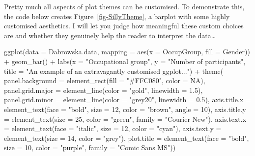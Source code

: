 \documentclass[
  letterpaper,
  DIV=11,
  numbers=noendperiod]{scrreprt}
\newenvironment{Shaded}{\begin{snugshade}}{\end{snugshade}}
\newcommand{\AttributeTok}[1]{\textcolor[rgb]{0.40,0.45,0.13}{#1}}
\newcommand{\ConstantTok}[1]{\textcolor[rgb]{0.56,0.35,0.01}{#1}}
\newcommand{\DecValTok}[1]{\textcolor[rgb]{0.68,0.00,0.00}{#1}}
\newcommand{\FloatTok}[1]{\textcolor[rgb]{0.68,0.00,0.00}{#1}}
\newcommand{\FunctionTok}[1]{\textcolor[rgb]{0.28,0.35,0.67}{#1}}
\newcommand{\NormalTok}[1]{\textcolor[rgb]{0.00,0.23,0.31}{#1}}
\newcommand{\SpecialCharTok}[1]{\textcolor[rgb]{0.37,0.37,0.37}{#1}}
\newcommand{\StringTok}[1]{\textcolor[rgb]{0.13,0.47,0.30}{#1}}
\begin{document}
Pretty much all aspects of plot themes can be customised. To demonstrate
this, the code below creates Figure~\ref{fig-SillyTheme}, a barplot with
some highly customised aesthetics. I will let you judge how meaningful
these custom choices are and whether they genuinely help the reader to
interpret the data\ldots~

\begin{Shaded}
\begin{Highlighting}[]
\FunctionTok{ggplot}\NormalTok{(}\AttributeTok{data =}\NormalTok{ Dabrowska.data,}
       \AttributeTok{mapping =} \FunctionTok{aes}\NormalTok{(}\AttributeTok{x =}\NormalTok{ OccupGroup, }\AttributeTok{fill =}\NormalTok{ Gender)) }\SpecialCharTok{+}
  \FunctionTok{geom\_bar}\NormalTok{() }\SpecialCharTok{+}
  \FunctionTok{labs}\NormalTok{(}\AttributeTok{x =} \StringTok{"Occupational group"}\NormalTok{,}
       \AttributeTok{y =} \StringTok{"Number of participants"}\NormalTok{,}
       \AttributeTok{title =} \StringTok{"An example of an extravagantly customised ggplot..."}\NormalTok{) }\SpecialCharTok{+}
    \FunctionTok{theme}\NormalTok{(}
      \AttributeTok{panel.background =} \FunctionTok{element\_rect}\NormalTok{(}\AttributeTok{fill =} \StringTok{"\#FFC080"}\NormalTok{, }\AttributeTok{color =} \ConstantTok{NA}\NormalTok{),}
      \AttributeTok{panel.grid.major =} \FunctionTok{element\_line}\NormalTok{(}\AttributeTok{color =} \StringTok{"gold"}\NormalTok{, }\AttributeTok{linewidth =} \FloatTok{1.5}\NormalTok{),}
      \AttributeTok{panel.grid.minor =} \FunctionTok{element\_line}\NormalTok{(}\AttributeTok{color =} \StringTok{"grey20"}\NormalTok{, }\AttributeTok{linewidth =} \FloatTok{0.5}\NormalTok{),}
      \AttributeTok{axis.title.x =} \FunctionTok{element\_text}\NormalTok{(}\AttributeTok{face =} \StringTok{"bold"}\NormalTok{, }\AttributeTok{size =} \DecValTok{12}\NormalTok{, }\AttributeTok{color =} \StringTok{"brown"}\NormalTok{, }\AttributeTok{angle =} \DecValTok{10}\NormalTok{),}
      \AttributeTok{axis.title.y =} \FunctionTok{element\_text}\NormalTok{(}\AttributeTok{size =} \DecValTok{25}\NormalTok{, }\AttributeTok{color =} \StringTok{"green"}\NormalTok{, }\AttributeTok{family =} \StringTok{"Courier New"}\NormalTok{),}
      \AttributeTok{axis.text.x =} \FunctionTok{element\_text}\NormalTok{(}\AttributeTok{face =} \StringTok{"italic"}\NormalTok{, }\AttributeTok{size =} \DecValTok{12}\NormalTok{, }\AttributeTok{color =} \StringTok{"cyan"}\NormalTok{),}
      \AttributeTok{axis.text.y =} \FunctionTok{element\_text}\NormalTok{(}\AttributeTok{size =} \DecValTok{14}\NormalTok{, }\AttributeTok{color =} \StringTok{"grey"}\NormalTok{),}
      \AttributeTok{plot.title =} \FunctionTok{element\_text}\NormalTok{(}\AttributeTok{face =} \StringTok{"bold"}\NormalTok{, }\AttributeTok{size =} \DecValTok{10}\NormalTok{, }\AttributeTok{color =} \StringTok{"purple"}\NormalTok{, }\AttributeTok{family =} \StringTok{"Comic Sans MS"}\NormalTok{))}
\end{Highlighting}
\end{Shaded}
\end{document}
